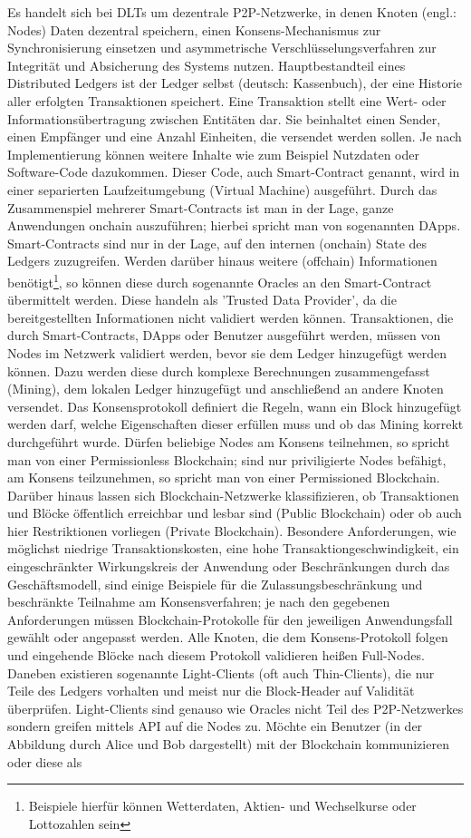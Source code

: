 Es handelt sich bei \ac{DLT}s um dezentrale \ac{P2P}-Netzwerke, in denen Knoten (engl.: Nodes) Daten dezentral speichern, einen Konsens-Mechanismus zur Synchronisierung einsetzen und asymmetrische Verschlüsselungsverfahren zur Integrität und Absicherung des Systems nutzen. Hauptbestandteil eines Distributed Ledgers ist der Ledger selbst (deutsch: Kassenbuch), der eine Historie aller erfolgten Transaktionen speichert. Eine Transaktion stellt eine Wert- oder Informationsübertragung zwischen Entitäten dar. Sie beinhaltet einen Sender, einen Empfänger und eine Anzahl Einheiten, die versendet werden sollen. Je nach Implementierung können weitere Inhalte wie zum Beispiel Nutzdaten oder Software-Code dazukommen. Dieser Code, auch Smart-Contract genannt, wird in einer separierten Laufzeitumgebung (Virtual Machine) ausgeführt. Durch das Zusammenspiel mehrerer Smart-Contracts ist man in der Lage, ganze Anwendungen onchain auszuführen; hierbei spricht man von sogenannten \ac{DApp}s. Smart-Contracts sind nur in der Lage, auf den internen (onchain) State des Ledgers zuzugreifen. Werden darüber hinaus weitere (offchain) Informationen benötigt\footnote{Beispiele hierfür können Wetterdaten, Aktien- und Wechselkurse oder Lottozahlen sein}, so können diese durch sogenannte Oracles an den Smart-Contract übermittelt werden. Diese handeln als 'Trusted Data Provider', da die bereitgestellten Informationen nicht validiert werden können. Transaktionen, die durch Smart-Contracts, \ac{DApp}s oder Benutzer ausgeführt werden, müssen von Nodes im Netzwerk validiert werden, bevor sie dem Ledger hinzugefügt werden können. Dazu werden diese durch komplexe Berechnungen zusammengefasst (Mining), dem lokalen Ledger hinzugefügt und anschließend an andere Knoten versendet. Das Konsensprotokoll definiert die Regeln, wann ein Block hinzugefügt werden darf, welche Eigenschaften dieser erfüllen muss und ob das Mining korrekt durchgeführt wurde. Dürfen beliebige Nodes am Konsens teilnehmen, so spricht man von einer Permissionless Blockchain; sind nur priviligierte Nodes befähigt, am Konsens teilzunehmen, so spricht man von einer Permissioned Blockchain. Darüber hinaus lassen sich Blockchain-Netzwerke klassifizieren, ob Transaktionen und Blöcke öffentlich erreichbar und lesbar sind (Public Blockchain) oder ob auch hier Restriktionen vorliegen (Private Blockchain). Besondere Anforderungen, wie möglichst niedrige Transaktionskosten, eine hohe Transaktiongeschwindigkeit, ein eingeschränkter Wirkungskreis der Anwendung oder Beschränkungen durch das Geschäftsmodell, sind einige Beispiele für die Zulassungsbeschränkung und beschränkte Teilnahme am Konsensverfahren; je nach den gegebenen Anforderungen müssen Blockchain-Protokolle für den jeweiligen Anwendungsfall gewählt oder angepasst werden. Alle Knoten, die dem Konsens-Protokoll folgen und eingehende Blöcke nach diesem Protokoll validieren heißen Full-Nodes. Daneben existieren sogenannte Light-Clients (oft auch Thin-Clients), die nur Teile des Ledgers vorhalten und meist nur die Block-Header auf Validität überprüfen. Light-Clients sind genauso wie Oracles nicht Teil des \ac{P2P}-Netzwerkes sondern greifen mittels \ac{API} auf die Nodes zu. Möchte ein Benutzer (in der Abbildung durch Alice und Bob dargestellt) mit der Blockchain kommunizieren oder diese als 